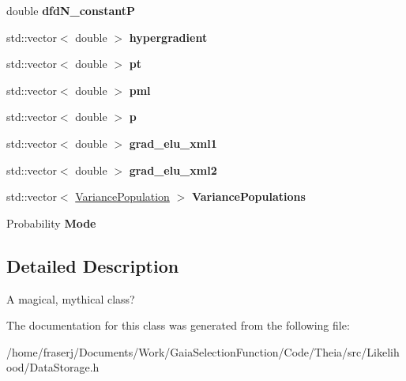 \begin{DoxyCompactItemize}
double {\bfseries dfd\+N\+\_\+constantP}
\item 
\mbox{\label{classLikelihoodData_a2783d19e10a237046558f19a5b092b08}} 
std\+::vector$<$ double $>$ {\bfseries hypergradient}
\item 
\mbox{\label{classLikelihoodData_a2b64e9d5f3c7e213acc1624dee4f083c}} 
std\+::vector$<$ double $>$ {\bfseries pt}
\item 
\mbox{\label{classLikelihoodData_a1e6b3b209c44b5d459858ceaa58fca57}} 
std\+::vector$<$ double $>$ {\bfseries pml}
\item 
\mbox{\label{classLikelihoodData_ac8cba3cd7ccaa7bcade1ad9590cd7e0a}} 
std\+::vector$<$ double $>$ {\bfseries p}
\item 
\mbox{\label{classLikelihoodData_a214d9b6e92856dff046ba31ce3c931e9}} 
std\+::vector$<$ double $>$ {\bfseries grad\+\_\+elu\+\_\+xml1}
\item 
\mbox{\label{classLikelihoodData_ac803a4c9bd059ea6e23248cde5ff7290}} 
std\+::vector$<$ double $>$ {\bfseries grad\+\_\+elu\+\_\+xml2}
\item 
\mbox{\label{classLikelihoodData_a1a1b8c65c6e8c79e0a19d3ccaa812087}} 
std\+::vector$<$ \hyperlink{structVariancePopulation}{Variance\+Population} $>$ {\bfseries Variance\+Populations}
\item 
\mbox{\label{classLikelihoodData_af71c3fde62f3e51803d19bd878f274c0}} 
Probability {\bfseries Mode}
\end{DoxyCompactItemize}


\subsection{Detailed Description}
A magical, mythical class? 

The documentation for this class was generated from the following file\+:\begin{DoxyCompactItemize}
\item 
/home/fraserj/\+Documents/\+Work/\+Gaia\+Selection\+Function/\+Code/\+Theia/src/\+Likelihood/Data\+Storage.\+h\end{DoxyCompactItemize}
